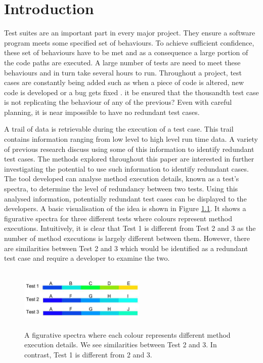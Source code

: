 \chapter{Introduction}\label{C:intro}

Test suites are an important part in every major project. They ensure a software program meets some specified set of behaviours. To achieve sufficient confidence, these set of behaviours have to be met and as a consequence a large portion of the code paths are executed. A large number of tests are need to meet these behaviours and in turn take several hours to run. 
Throughout a project, test cases are constantly being added such as when a piece of code is altered, new code is developed or a bug gets fixed \cite{issuetrack,whentotest}.  it be ensured that the thousandth test case is not replicating the behaviour of any of the previous? Even with careful planning, it is near impossible to have no redundant test cases. 

A trail of data is retrievable during the execution of a test case. This trail contains information ranging from low level to high level run time data. A variety of previous research \cite{wong1995effect, wong1999test, rothermel1998empirical, rothermel2002empirical,koochakzadeh2009test,zhang2011empirical,li2008static} discuss using some of this information to identify redundant test cases. The methods explored throughout this paper are interested in further investigating the potential to use such information to identify redundant cases. The tool developed can analyse method execution details, known as a test's spectra, to determine the level of redundancy between two tests. Using this analysed information, potentially redundant test cases can be displayed to the developers. A basic visualisation of the idea is shown in Figure \ref{fig:spectra}. It shows a figurative spectra for three different tests where colours represent method executions. Intuitively, it is clear that Test 1 is different from Test 2 and 3 as the number of method executions is largely different between them. However, there are similarities between Test 2 and 3 which would be identified as a redundant test case and require a developer to examine the two. 

\begin{figure}[h]
\centering
\includegraphics[width=6cm,height=3cm]{spectra.png}
\caption{A figurative spectra where each colour represents different method execution details. We see similarities between Test 2 and 3. In contrast, Test 1 is different from 2 and 3. }
\label{fig:spectra}
\end{figure}

